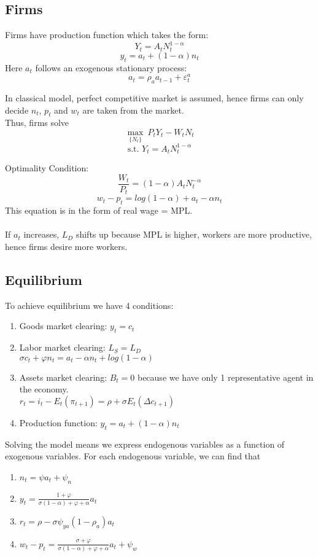 \documentclass{article}
\begin{document}
\subsection{Firms}
Firms have production function which takes the form:
$$Y_t = A_t N_t^{1-\alpha}$$
$$y_t = a_t + (1-\alpha)n_t$$
Here $a_t$ follows an exogenous stationary process:
$$a_t = \rho_a a_{t-1} + \varepsilon_t^a$$

In classical model, perfect competitive market is assumed, hence firms can only decide $n_t$, $p_t$ and $w_t$ are taken from the market.\\

Thus, firms solve
$$\max_{\{N_t\}}\ P_tY_t - W_t N_t$$
$$\text{s.t. } Y_t = A_tN_t^{1-\alpha}$$

Optimality Condition:
$$\frac{W_t}{P_t} = (1-\alpha)A_t N_t^{-\alpha}$$
$$w_t - p_t = log(1-\alpha) + a_t - \alpha n_t$$
This equation is in the form of real wage = MPL.\\
\\
If $a_t$ increases, $L_D$ shifts up because MPL is higher, workers are more productive, hence firms desire more workers.

\subsection{Equilibrium}
To achieve equilibrium we have 4 conditions:
\begin{enumerate}
    \item Goods market clearing: $y_t = c_t$
    \item Labor market clearing: $L_S = L_D$\\
    $\sigma c_t + \varphi n_t = a_t - \alpha n_t + log(1-\alpha)$
    \item Assets market clearing: $B_t = 0$ because we have only 1 representative agent in the economy.\\
    $r_t = i_t - E_t(\pi_{t+1}) = \rho + \sigma E_t(\Delta c_{t+1})$
    \item Production function: $y_t = a_t + (1-\alpha)n_t$\\
\end{enumerate}

Solving the model means we express endogenous variables as a function of exogenous variables. For each endogenous variable, we can find that
\begin{enumerate}
    \item $n_t = \psi a_t + \psi_n$
    \item $y_t = \frac{1+\varphi}{\sigma(1-\alpha) + \varphi + \alpha}a_t$
    \item $r_t = \rho - \sigma \psi_{ya}(1-\rho_a)a_t$
    \item $w_t - p_t = \frac{\sigma+\varphi}{\sigma(1-\alpha) + \varphi + \alpha}a_t + \psi_w$\\
\end{enumerate}
\end{document}
